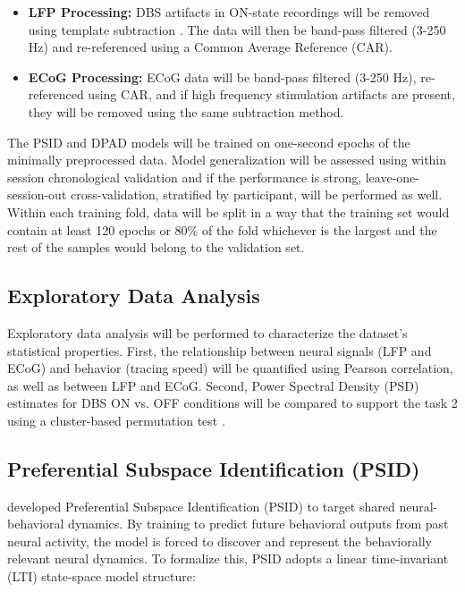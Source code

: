 \documentclass[12pt, letterpaper]{article}
\begin{document}
\begin{itemize}

    \item \textbf{LFP Processing:} DBS artifacts in ON-state recordings will be removed using template subtraction \parencite{qianMethodRemovalDeep2017,hammerArtifactCharacterizationMultipurpose2022}. The data will then be band-pass filtered (3-250 Hz) and re-referenced using a Common Average Reference (CAR).

    \item \textbf{ECoG Processing:} ECoG data will be band-pass filtered (3-250 Hz), re-referenced using CAR, and if high frequency stimulation artifacts are present, they will be removed using the same subtraction method.

\end{itemize}

The PSID and DPAD models will be trained on one-second epochs of the minimally preprocessed data. Model generalization will be assessed using within session chronological validation and if the performance is strong, leave-one-session-out cross-validation, stratified by participant, will be performed as well. Within each training fold, data will be split in a way that the training set would contain at least 120 epochs or 80\% of the fold whichever is the largest and the rest of the samples would belong to the validation set. 
\subsection{Exploratory Data Analysis}

Exploratory data analysis will be performed to characterize the dataset's statistical properties. First, the relationship between neural signals (LFP and ECoG) and behavior (tracing speed) will be quantified using Pearson correlation, as well as between LFP and ECoG. Second, Power Spectral Density (PSD) estimates for DBS ON vs. OFF conditions will be compared to support the task 2 using a cluster-based permutation test \parencite{marisNonparametricStatisticalTesting2007}.

\subsection{Preferential Subspace Identification (PSID)}

\textcite{saniModelingBehaviorallyRelevant2021} developed Preferential Subspace Identification (PSID) to target shared neural-behavioral dynamics. By training to predict future behavioral outputs from past neural activity, the model is forced to discover and represent the behaviorally relevant neural dynamics. To formalize this, PSID adopts a linear time-invariant (LTI) state-space model structure:
\end{document}
